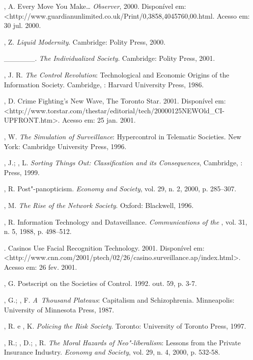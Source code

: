 \begin{Parskip}
, A. Every Move You Make\ldots{} \emph{Observer}, 2000.
Disponível em:
\textless{}http://www.guardianunlimited.co.uk/Print/0,3858,4045760,00.html.%
Acesso em: 30 jul. 2000.

, Z. \emph{Liquid Modernity}. Cambridge: Polity Press, 2000.

\_\_\_\_\_\_. \emph{The Individualized Society}. Cambridge: Polity
Press, 2001.

, J. R. \emph{The Control Revolution}: Technological and Economic
Origins of the Information Society. Cambridge, : Harvard University
Press, 1986.

, D. Crime Fighting's New Wave, The Toronto Star. 2001. Disponível
em:
\textless{}http://www.torstar.com/thestar/editorial/tech/20000125NEWOld\_CI-UPFRONT.htm\textgreater{}.%
Acesso em: 25 jan. 2001.

, W. \emph{The Simulation of Surveillance}: Hypercontrol in
Telematic Societies. New York: Cambridge University Press, 1996.

, J.; , L. \emph{Sorting Things Out: Classification and its
Consequences}, Cambridge, :  Press, 1999.

, R. Post"-panopticism. \emph{Economy and Society}, vol. 29, n. 2,
2000, p. 285--307.

, M. \emph{The Rise of the Network Society}. Oxford: Blackwell,
1996.

, R. Information Technology and Dataveillance.
\emph{Communications of the }, vol. 31, n. 5, 1988, p. 498--512.

. Casinos Use Facial Recognition Technology. 2001. Disponível em:
\textless{}http://www.cnn.com/2001/ptech/02/26/casino.surveillance.ap/index.html\textgreater{}.%
Acesso em: 26 fev. 2001.

, G. Postscript on the Societies of Control. 1992. out. 59, p.
3-7.

, G.; , F. \emph{A~Thousand Plateaus}: Capitalism and
Schizophrenia. Minneapolis: University of Minnesota Press, 1987.

, R. e , K. \emph{Policing the Risk Society}. Toronto:
University of Toronto Press, 1997.

, R.; , D.; , R. \emph{The Moral Hazards of
Neo"-liberalism}: Lessons from the Private Insurance Industry.
\emph{Economy and Society}, vol. 29, n. 4, 2000, p. 532-58.


\end{Parskip}

